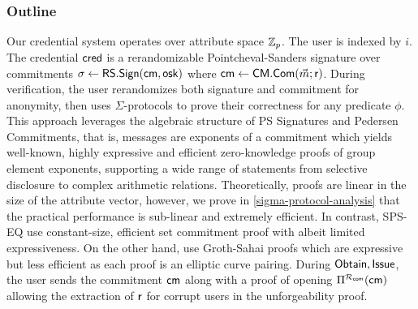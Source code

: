 \subsubsection{Outline}
Our credential system operates over attribute space $\mathbb{Z}_p$. The user is indexed by $i$. The credential $\mathsf{cred}$ is a rerandomizable Pointcheval-Sanders signature over commitments $\sigma \gets \mathsf{RS.Sign}(\mathsf{cm}, \mathsf{osk})$ where $\mathsf{cm} \gets \mathsf{CM.Com}(\vec{m}; \mathsf{r})$. During verification, the user rerandomizes both signature and commitment for anonymity, then uses $\Sigma$-protocols to prove their correctness for any predicate $\phi$. This approach leverages the algebraic structure of PS Signatures and Pedersen Commitments, that is, messages are exponents of a commitment which yields well-known, highly expressive and efficient zero-knowledge proofs of group element exponents, supporting a wide range of statements from selective disclosure to complex arithmetic relations. Theoretically, proofs are linear in the size of the attribute vector, however, we prove in \ref{sigma-protocol-analysis} that the practical performance is sub-linear and extremely efficient. In contrast, SPS-EQ \cite{fuchsbauer_structure-preserving_2019, hanaoka_improved_2022} use constant-size, efficient set commitment proof with albeit limited expressiveness. On the other hand, \cite{rabaninejad_attribute-based_2024} use Groth-Sahai proofs which are expressive but less efficient as each proof is an elliptic curve pairing. During $\mathsf{Obtain}, \mathsf{Issue}$, the user sends the commitment $\mathsf{cm}$ along with a proof of opening $\Pi^{\mathcal{R}_{\mathsf{com}}}(\mathsf{cm})$ allowing the extraction of $\mathsf{r}$ for corrupt users in the unforgeability proof.


